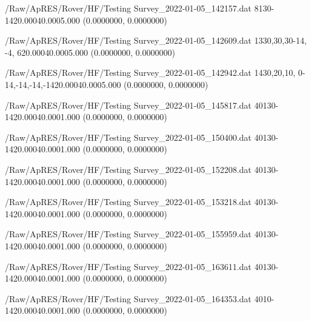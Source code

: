 \hfaprestable
{/Raw/ApRES/Rover/HF/Testing}%
{Survey\_2022-01-05\_142157.dat}%
{8}{1}{30}{-14}{20.000}{40.000}{5.000}%
{ (0.0000000, 0.0000000)}%
{}%
{}%

\hfaprestable
{/Raw/ApRES/Rover/HF/Testing}%
{Survey\_2022-01-05\_142609.dat}%
{1}{3}{30,30,30}{-14, -4,  6}{20.000}{40.000}{5.000}%
{ (0.0000000, 0.0000000)}%
{}%
{}%

\hfaprestable
{/Raw/ApRES/Rover/HF/Testing}%
{Survey\_2022-01-05\_142942.dat}%
{1}{4}{30,20,10, 0}{-14,-14,-14,-14}{20.000}{40.000}{5.000}%
{ (0.0000000, 0.0000000)}%
{}%
{}%

\hfaprestable
{/Raw/ApRES/Rover/HF/Testing}%
{Survey\_2022-01-05\_145817.dat}%
{40}{1}{30}{-14}{20.000}{40.000}{1.000}%
{ (0.0000000, 0.0000000)}%
{}%
{}%

\hfaprestable
{/Raw/ApRES/Rover/HF/Testing}%
{Survey\_2022-01-05\_150400.dat}%
{40}{1}{30}{-14}{20.000}{40.000}{1.000}%
{ (0.0000000, 0.0000000)}%
{}%
{}%

\hfaprestable
{/Raw/ApRES/Rover/HF/Testing}%
{Survey\_2022-01-05\_152208.dat}%
{40}{1}{30}{-14}{20.000}{40.000}{1.000}%
{ (0.0000000, 0.0000000)}%
{}%
{}%

\hfaprestable
{/Raw/ApRES/Rover/HF/Testing}%
{Survey\_2022-01-05\_153218.dat}%
{40}{1}{30}{-14}{20.000}{40.000}{1.000}%
{ (0.0000000, 0.0000000)}%
{}%
{}%

\hfaprestable
{/Raw/ApRES/Rover/HF/Testing}%
{Survey\_2022-01-05\_155959.dat}%
{40}{1}{30}{-14}{20.000}{40.000}{1.000}%
{ (0.0000000, 0.0000000)}%
{}%
{}%

\hfaprestable
{/Raw/ApRES/Rover/HF/Testing}%
{Survey\_2022-01-05\_163611.dat}%
{40}{1}{30}{-14}{20.000}{40.000}{1.000}%
{ (0.0000000, 0.0000000)}%
{}%
{}%

\hfaprestable
{/Raw/ApRES/Rover/HF/Testing}%
{Survey\_2022-01-05\_164353.dat}%
{40}{1}{0}{-14}{20.000}{40.000}{1.000}%
{ (0.0000000, 0.0000000)}%
{}%
{}%

